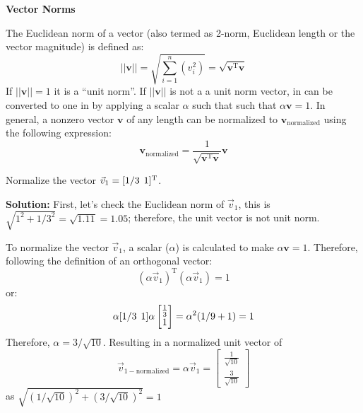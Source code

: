 \documentclass[12pt,letter]{article}
\begin{document}
	
		\begin{review}	
		\textbf{Vector Norms} 
		
	The Euclidean norm of a vector (also termed as 2-norm, Euclidean length or the vector magnitude) is defined as:
	\begin{equation}
	||\textbf{v}|| = \sqrt{\sum_{i=1}^{n}(v_i^2)} = \sqrt{\textbf{v}^{\text{T}}\textbf{v}}
	\end{equation} 
	If $||\textbf{v}|| = 1$ it is a ``unit norm''. If $||\textbf{v}||$ is not a a unit norm vector, in can be converted to one in by applying a scalar $\alpha$ such that such that $\alpha\textbf{v}=1$. In general, a nonzero vector $\textbf{v}$ of any length can be normalized to $\textbf{v}_\text{normalized}$ using the following expression:
		\begin{equation}
		\textbf{v}_\text{normalized} = \frac{1}{\sqrt{\textbf{v}^{\text{T}}\textbf{v}} } \textbf{v}
		\end{equation}
	\end{review}	

	
	
	 
	
	\begin{example}
	\label{ex:vector_normalizeation}
	Normalize the vector $\vec{v}_1=[1/3 \hspace{1ex} 1]^\text{T}$.
	
	\textbf{Solution:} First, let's check the Euclidean norm of $\vec{v}_1$, this is $\sqrt{1^2+1/3^2} = \sqrt{1.11} = 1.05$; therefore, the unit vector is not unit norm.
	
	To normalize the vector $\vec{v}_1$, a scalar ($\alpha$) is calculated to make $\alpha\textbf{v}=1$.  Therefore, following the definition of an orthogonal vector:
	\begin{equation}
	(\alpha \vec{v}_1)^\text{T}(\alpha \vec{v}_1) = 1
	\end{equation}
	or:
	\begin{equation}
	\alpha [1/3 \hspace{1ex} 1]\alpha  \begin{bmatrix} \frac{1}{3}\\  1 \end{bmatrix}  = \alpha^2(1/9+1) = 1
	\end{equation}
	Therefore, $\alpha=3/\sqrt{10}$. Resulting in a normalized unit vector of
	\begin{equation}
		\vec{v}_{1-\text{normalized}} = \alpha\vec{v}_1= \begin{bmatrix} \frac{1}{\sqrt{10}}\\  \frac{3}{\sqrt{10}} \end{bmatrix}
		\end{equation}
		 as $\sqrt{(1/\sqrt{10})^2 + (3/\sqrt{10})^2} =1$
	
	\end{example}	
	
\end{document}
